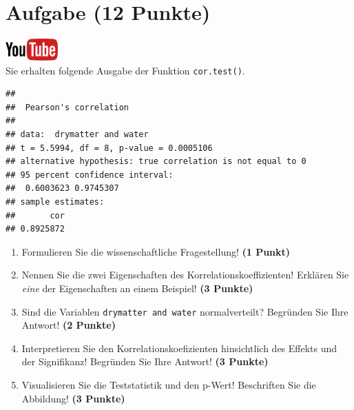 \documentclass[a4paper, 9pt]{scrartcl}\usepackage[]{graphicx}\usepackage[]{xcolor}
\makeatletter
\newenvironment{kframe}{%
 \def\at@end@of@kframe{}%
 \ifinner\ifhmode%
  \def\at@end@of@kframe{\end{minipage}}%
  \begin{minipage}{\columnwidth}%
 \fi\fi%
 \def\FrameCommand##1{\hskip\@totalleftmargin \hskip-\fboxsep
 \colorbox{shadecolor}{##1}\hskip-\fboxsep
     \hskip-\linewidth \hskip-\@totalleftmargin \hskip\columnwidth}%
 \MakeFramed {\advance\hsize-\width
   \@totalleftmargin\z@ \linewidth\hsize
   \@setminipage}}%
 {\par\unskip\endMakeFramed%
 \at@end@of@kframe}
\newenvironment{knitrout}{}{} %
\makeatother
\begin{document}
 
\clearpage

\section{Aufgabe \hfill (12 Punkte)}

\hfill\href{https://youtu.be/C9skfFRTHhI}{\includegraphics[width =
   2cm]{img/youtube}}\\[1Ex]

Sie erhalten folgende \Rlogo Ausgabe der Funktion \texttt{cor.test()}.

\begin{knitrout}
\color{fgcolor}\begin{kframe}
\begin{verbatim}
## 
## 	Pearson's correlation
## 
## data:  drymatter and water
## t = 5.5994, df = 8, p-value = 0.0005106
## alternative hypothesis: true correlation is not equal to 0
## 95 percent confidence interval:
##  0.6003623 0.9745307
## sample estimates:
##       cor 
## 0.8925872
\end{verbatim}
\end{kframe}
\end{knitrout}


\begin{enumerate}
  \item Formulieren Sie die wissenschaftliche Fragestellung! \textbf{(1
Punkt)}
\item Nennen Sie die zwei Eigenschaften des Korrelationskoeffizienten!
  Erkl{\"a}ren Sie \textit{eine} der Eigenschaften an einem Beispiel! \textbf{(3
    Punkte)}
\item Sind die Variablen \texttt{drymatter and water} normalverteilt?
  Begr{\"u}nden Sie Ihre Antwort! \textbf{(2 Punkte)}
\item Interpretieren Sie den Korrelationskoefizienten hinsichtlich des
  Effekts und der Signifikanz! Begr{\"u}nden Sie
  Ihre Antwort! \textbf{(3 Punkte)}
\item Visualisieren Sie die Teststatistik und den p-Wert! Beschriften Sie die Abbildung! \textbf{(3 Punkte)} 
\end{enumerate} 
\clearpage
\end{document}
